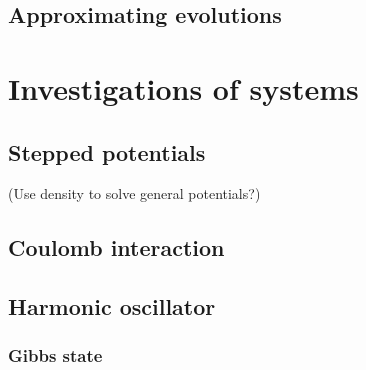 \section{Approximating evolutions}

\chapter{Investigations of systems}
\section{Stepped potentials}
(Use density to solve general potentials?)
\section{Coulomb interaction}
\section{Harmonic oscillator}

\subsection{Gibbs state}

